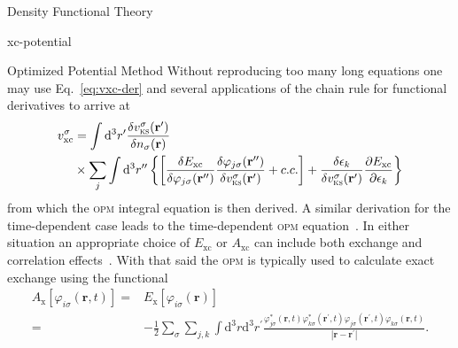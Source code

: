 \documentclass[letterpaper, 10 pt]{report}
\begin{document}
\begin{chapter}{Density Functional Theory \label{chap:dft}}
\begin{section}{xc-potential \label{sec:xcpot}}
\begin{subsection}{Optimized Potential Method \label{sec:opm}}
         Without reproducing too many long equations one may use Eq.~\eqref{eq:vxc-der} and several
         applications of the chain rule for functional derivatives to arrive at
         \begin{equation} \label{eq:opm1}
            \begin{split}
               v^\sigma_\mathrm{xc} & = \int \mathrm{d}^3 r^\prime
                  \frac{\delta v^\sigma_\mathrm{\textsc{ks}}(\mathbf{r^\prime})}
                       {\delta n_\sigma(\mathbf{r}) } \\
                                    & \times \sum\limits_{j} \int \mathrm{d}^3 r^{\prime\prime}
               \left\{ \left[ 
               \frac{\delta E_\mathrm{xc}}{\delta \varphi_{j\sigma}(\mathbf{r^{\prime\prime}}) }
               \frac{\delta \varphi_{j\sigma}(\mathbf{r^{\prime\prime}}) }
                    {\delta v^\sigma_\mathrm{\textsc{ks}}(\mathbf{r^{\prime}}) }
               + c.c.
            \right]
               + \frac{\delta \epsilon_k}{\delta v^\sigma_\mathrm{\textsc{ks}}(\mathbf{r^{\prime}})}
              \frac{\partial E_\mathrm{xc}}{\partial \epsilon_k}
            \right\}
            \end{split}
         \end{equation}
         from which the \textsc{opm} integral equation is then derived. A similar derivation for the
         time-dependent case leads to the time-dependent \textsc{opm} equation~\cite{tdopm}. In either
         situation an appropriate choice of $E_\mathrm{xc}$ or $A_\mathrm{xc}$ can include both exchange
         and correlation effects~\cite{opm5, tdopm}. With that said the \textsc{opm} is typically used
         to calculate exact exchange using the functional
         \begin{equation} \label{eq:xfunc}
            \begin{split}
               A_\mathrm{x}[\varphi_{i\sigma}(\mathbf{r},t)]
                 = & E_\mathrm{x}[\varphi_{i\sigma}(\mathbf{r})] \\
                = & -\frac{1}{2} \sum\limits_\sigma \sum\limits_{j,k}
                    \int\mathrm{d}^3 r \mathrm{d}^3 r^\prime
                    \frac{ \varphi^*_{j\sigma}(\mathbf{r},t) \varphi^*_{k\sigma}(\mathbf{r}^\prime,t)
                   \varphi_{j\sigma}(\mathbf{r}^\prime,t) \varphi_{k\sigma}(\mathbf{r},t)}
                   {\left| \mathbf{r} -\mathbf{r}^\prime \right|}.
            \end{split}
         \end{equation}


\end{subsection}
\end{section}
\end{chapter}
\end{document}
